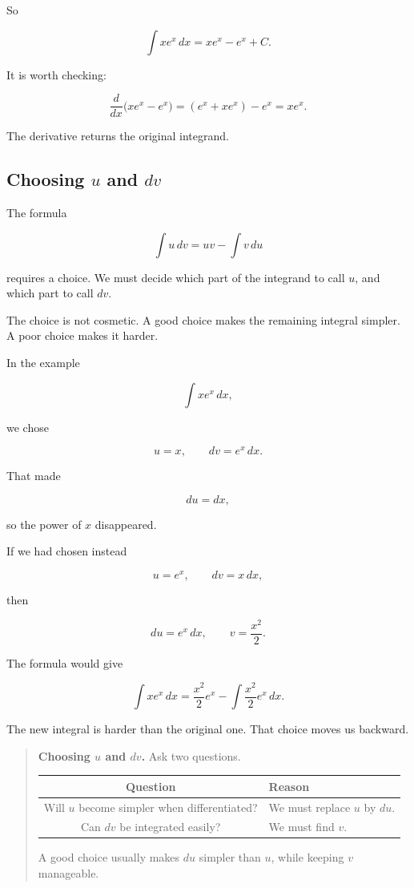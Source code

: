 So

\[
\boxed{
\int x e^x\,dx
=
x e^x-e^x+C.
}
\]

It is worth checking:

\[
\frac{d}{dx}\bigl(xe^x-e^x\bigr)
=
(e^x+xe^x)-e^x
=
xe^x.
\]

The derivative returns the original integrand.

\subsection{Choosing \texorpdfstring{\(u\)}{u} and \texorpdfstring{\(dv\)}{dv}}
\label{subsec:choosing-u-dv}

The formula

\[
\int u\,dv=uv-\int v\,du
\]

requires a choice.  We must decide which part of the integrand to call \(u\), and
which part to call \(dv\).

The choice is not cosmetic.  A good choice makes the remaining integral simpler.
A poor choice makes it harder.

In the example

\[
\int x e^x\,dx,
\]

we chose

\[
u=x,
\qquad
dv=e^x\,dx.
\]

That made

\[
du=dx,
\]

so the power of \(x\) disappeared.

If we had chosen instead

\[
u=e^x,
\qquad
dv=x\,dx,
\]

then

\[
du=e^x\,dx,
\qquad
v=\frac{x^2}{2}.
\]

The formula would give

\[
\int x e^x\,dx
=
\frac{x^2}{2}e^x-\int \frac{x^2}{2}e^x\,dx.
\]

The new integral is harder than the original one.  That choice moves us backward.

\begin{quote}
\textbf{Choosing \(u\) and \(dv\).}
Ask two questions.

\begin{center}
\begin{tabular}{c|l}
\textbf{Question} & \textbf{Reason} \\ \hline
Will \(u\) become simpler when differentiated? & We must replace \(u\) by \(du\). \\[3pt]
Can \(dv\) be integrated easily? & We must find \(v\).
\end{tabular}
\end{center}

A good choice usually makes \(du\) simpler than \(u\), while keeping \(v\) manageable.
\end{quote}

